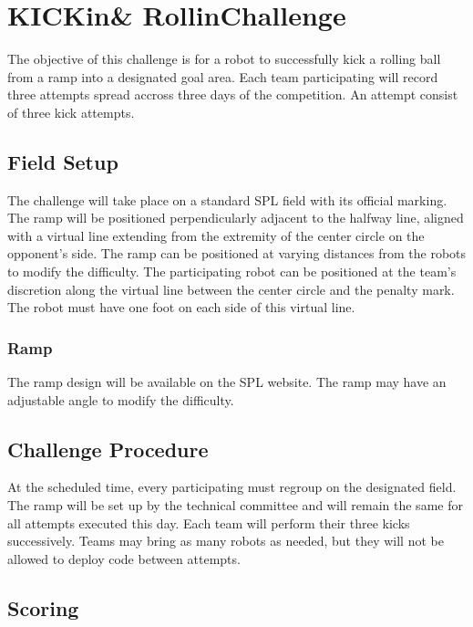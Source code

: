 \section{KICKin\textquotesingle \& Rollin\textquotesingle Challenge}

The objective of this challenge is for a robot to successfully kick a rolling ball from a ramp into a designated goal area. 
Each team participating will record three attempts spread accross three days of the competition.
An attempt consist of three kick attempts. 

\subsection{Field Setup}

The challenge will take place on a standard SPL field with its official marking. 
The ramp will be positioned perpendicularly adjacent to the halfway line, aligned with a virtual line extending from the extremity of the center circle on the opponent's side.
The ramp can be positioned at varying distances from the robots to modify the difficulty.
The participating robot can be positioned at the team’s discretion along the virtual line between the center circle and the penalty mark.
The robot must have one foot on each side of this virtual line.

\subsubsection{Ramp}

The ramp design will be available on the SPL website.
The ramp may have an adjustable angle to modify the difficulty.


\subsection{Challenge Procedure}

At the scheduled time, every participating must regroup on the designated field. 
The ramp will be set up by the technical committee and will remain the same for all attempts executed this day.
Each team will perform their three kicks successively.
Teams may bring as many robots as needed, but they will not be allowed to deploy code between attempts.

\subsection{Scoring}

